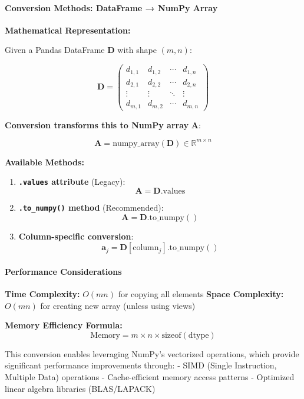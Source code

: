 \documentclass[11pt]{article}
\begin{document}
\paragraph{Conversion Methods: DataFrame → NumPy
Array}\label{conversion-methods-dataframe-numpy-array}

\textbf{Mathematical Representation:}

Given a Pandas DataFrame \(\mathbf{D}\) with shape \((m, n)\):

\[\mathbf{D} = \begin{pmatrix}
d_{1,1} & d_{1,2} & \cdots & d_{1,n} \\
d_{2,1} & d_{2,2} & \cdots & d_{2,n} \\
\vdots & \vdots & \ddots & \vdots \\
d_{m,1} & d_{m,2} & \cdots & d_{m,n}
\end{pmatrix}\]

\textbf{Conversion transforms this to NumPy array} \(\mathbf{A}\):

\[\mathbf{A} = \text{numpy\_array}(\mathbf{D}) \in \mathbb{R}^{m \times n}\]

\textbf{Available Methods:}

\begin{enumerate}
\def\labelenumi{\arabic{enumi}.}
\item
  \textbf{\texttt{.values} attribute} (Legacy):
  \[\mathbf{A} = \mathbf{D}.\text{values}\]
\item
  \textbf{\texttt{.to\_numpy()} method} (Recommended):
  \[\mathbf{A} = \mathbf{D}.\text{to\_numpy}()\]
\item
  \textbf{Column-specific conversion}:
  \[\mathbf{a}_j = \mathbf{D}[\text{column}_j].\text{to\_numpy}()\]
\end{enumerate}

\paragraph{Performance Considerations}\label{performance-considerations}

\textbf{Time Complexity:} \(O(mn)\) for copying all elements
\textbf{Space Complexity:} \(O(mn)\) for creating new array (unless
using views)

\textbf{Memory Efficiency Formula:}
\[\text{Memory} = m \times n \times \text{sizeof}(\text{dtype})\]

This conversion enables leveraging NumPy's vectorized operations, which
provide significant performance improvements through: - SIMD (Single
Instruction, Multiple Data) operations - Cache-efficient memory access
patterns - Optimized linear algebra libraries (BLAS/LAPACK)
\end{document}
